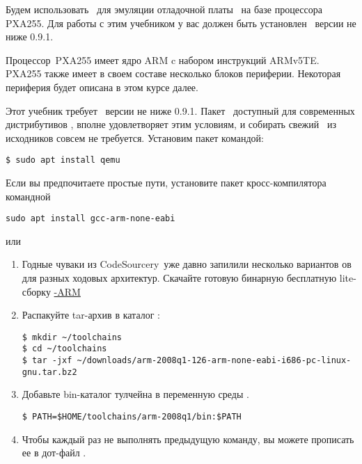 
Будем использовать \qemu\ для эмуляции отладочной платы \ на базе
процессора PXA255. Для работы с этим учебником у вас должен быть установлен
\qemu\ версии не ниже 0.9.1.

Процессор\ PXA255 имеет ядро ARM c
набором инструкций ARMv5TE. PXA255 также имеет в своем составе несколько блоков
периферии. Некоторая периферия будет описана в этом курсе далее.


Этот учебник требует \qemu\ версии не ниже 0.9.1. Пакет \qemu\ доступный для
современных дистрибутивов \debian, вполне удовлетворяет этим условиям, и
собирать свежий \qemu\ из исходников совсем не требуется. Установим пакет командой:

\begin{verbatim}
$ sudo apt install qemu
\end{verbatim}


Если вы предпочитаете простые пути, установите пакет кросс-компилятора командной

\begin{verbatim}
sudo apt install gcc-arm-none-eabi
\end{verbatim}

или

\begin{enumerate}
  \item Годные чуваки из CodeSourcery\ уже давно запилили несколько вариантов \gnut ов для разных ходовых
  архитектур. Скачайте готовую бинарную бесплатную lite-сборку
  \href{http://www.mentor.com/embedded-software/sourcery-tools/sourcery-codebench/editions/lite-edition/}{\gnut-ARM}
  
\item Распакуйте tar-архив в каталог :

\begin{verbatim}
$ mkdir ~/toolchains
$ cd ~/toolchains
$ tar -jxf ~/downloads/arm-2008q1-126-arm-none-eabi-i686-pc-linux-gnu.tar.bz2
\end{verbatim}

  \item Добавьте bin-каталог тулчейна в переменную среды .

\begin{verbatim}
$ PATH=$HOME/toolchains/arm-2008q1/bin:$PATH 
\end{verbatim}

\item Чтобы каждый раз не выполнять предыдущую команду, вы можете прописать
ее в дот-файл .

\end{enumerate}

